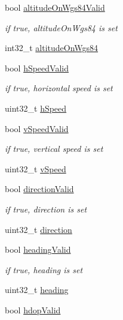 \begin{DoxyCompactItemize}
\item 
bool \hyperlink{structpa___gnss___position__t_a2f87cf58db4cd97a1ccde671cd1f44f0}{altitude\+On\+Wgs84\+Valid}
\begin{DoxyCompactList}\small\item\em if true, altitude\+On\+Wgs84 is set \end{DoxyCompactList}\item 
int32\+\_\+t \hyperlink{structpa___gnss___position__t_a7a98e437955e9839203934bc35a09e06}{altitude\+On\+Wgs84}
\item 
bool \hyperlink{structpa___gnss___position__t_a252e335dd2b04fee22f3170d496b61ea}{h\+Speed\+Valid}
\begin{DoxyCompactList}\small\item\em if true, horizontal speed is set \end{DoxyCompactList}\item 
uint32\+\_\+t \hyperlink{structpa___gnss___position__t_a892ce41c9bccf91bd72deb4dce3ea235}{h\+Speed}
\item 
bool \hyperlink{structpa___gnss___position__t_aef1c76ec888172dd9ca8aa95147452af}{v\+Speed\+Valid}
\begin{DoxyCompactList}\small\item\em if true, vertical speed is set \end{DoxyCompactList}\item 
uint32\+\_\+t \hyperlink{structpa___gnss___position__t_a0b496fc87fd41bfbbdf7821febbea3f6}{v\+Speed}
\item 
bool \hyperlink{structpa___gnss___position__t_a034396d8d956aab6c14109ff0e697d20}{direction\+Valid}
\begin{DoxyCompactList}\small\item\em if true, direction is set \end{DoxyCompactList}\item 
uint32\+\_\+t \hyperlink{structpa___gnss___position__t_addccf2b43c9aac8a1ee206a250c4ebe9}{direction}
\item 
bool \hyperlink{structpa___gnss___position__t_acd0e195757c5fae78484df73ffbb022a}{heading\+Valid}
\begin{DoxyCompactList}\small\item\em if true, heading is set \end{DoxyCompactList}\item 
uint32\+\_\+t \hyperlink{structpa___gnss___position__t_a237b9c9795926a4952d56446ced2a466}{heading}
\item 
bool \hyperlink{structpa___gnss___position__t_a3ae7d0d6c92f0fd4053b07489b6d227f}{hdop\+Valid}

\end{DoxyCompactItemize}
